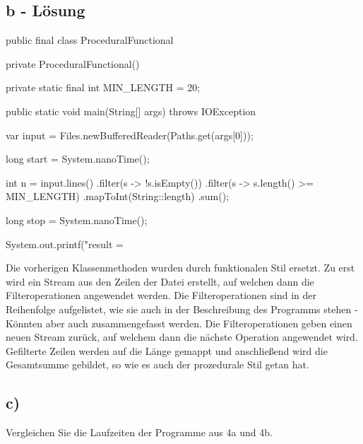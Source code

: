\subsection*{b - Lösung}
\newline
\begin{code}[language=java, caption={Aufgabe 4b - Lösung}, label={lst:Aufgabe4b}]
public final class ProceduralFunctional {
    private ProceduralFunctional() { }

    private static final int MIN_LENGTH = 20;

    public static void main(String[] args) throws IOException {
        var input = Files.newBufferedReader(Paths.get(args[0]));

        long start = System.nanoTime();

        int n = input.lines()
                .filter(s -> !s.isEmpty())
                .filter(s -> s.length() >= MIN_LENGTH)
                .mapToInt(String::length)
                .sum();

        long stop = System.nanoTime();

        System.out.printf("result = %
    }
}
\end{code}
\newline
Die vorherigen Klassenmethoden wurden durch funktionalen Stil ersetzt.
Zu erst wird ein Stream aus den Zeilen der Datei erstellt,
auf welchen dann die Filteroperationen angewendet werden.
Die Filteroperationen sind in der Reihenfolge aufgelistet, wie sie auch in der Beschreibung des Programms stehen
- Könnten aber auch zusammengefasst werden.
Die Filteroperationen geben einen neuen Stream zurück, auf welchem dann die nächste Operation angewendet wird.
Gefilterte Zeilen werden auf die Länge gemappt und anschließend wird die Gesamtsumme gebildet,
 so wie es auch der prozedurale Stil getan hat.
\newline

\subsection*{c)}
Vergleichen Sie die Laufzeiten der Programme aus 4a und 4b.
\newline
